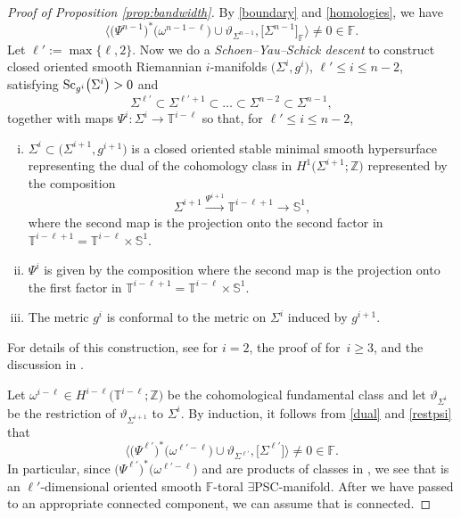 \documentclass[10pt,a4paper]{amsart}
\numberwithin{equation}{section}
\newcommand{\F}{\mathbb{F}}
\newcommand{\Z}{\mathbb{Z}}
\newcommand{\SSS}{\mathbb{S}}
\newcommand{\TTT}{\mathbb{T}}
\newcommand{\Sc}{{\rm Sc}}
\newcommand{\yes}{{\color {blue!70!black}$\exists$}{\sf PSC}}
\begin{document}
\begin{proof}[Proof of Proposition \ref{prop:bandwidth}]
By \eqref{boundary} and \eqref{homologies}, we have
\[
 \big\langle \big( \Psi^{n-1}\big)^* \big(\omega^{n-1-\ell}\big) \cup \vartheta_{\Sigma^{n-1}} , \big[\Sigma^{n-1}\big]_\F \big\rangle \neq 0 \in \F.
\]
Let $\ell' := \max\{ \ell, 2\}$.
Now we do a {\em Schoen--Yau--Schick descent} to construct closed oriented smooth Riemannian $i$-manifolds $\big(\Sigma^i, g^i\big)$, $\ell' \leq i \leq n-2$, satisfying $\Sc_{g^i} \big( \Sigma^i\big)> 0$ and
\[
 \Sigma^{\ell'} \subset \Sigma^{\ell'+1} \subset \dots \subset \Sigma^{n-2} \subset \Sigma^{n-1} ,
\]
together with maps $ \Psi^i \colon \Sigma^{i} \to {\TTT}^{i - \ell}$ so that, for $\ell' \leq i \leq n-2$,
\begin{enumerate}[(i)]\itemsep=0pt
 \item \label{dual} $\Sigma^{i} \subset \big(\Sigma^{i+1}, g^{i+1}\big)$ is a closed oriented stable minimal smooth hypersurface representing the dual of the cohomology class in $H^1\big(\Sigma^{i+1}; \Z\big)$ represented by the composition
 \[
 \Sigma^{i+1} \stackrel{\Psi^{i+1}}{\longrightarrow} {\TTT}^{i-\ell+1}\longrightarrow \SSS^1,
 \]
 where the second map is the projection onto the second factor in ${\TTT}^{i-\ell+1} = {\TTT}^{i-\ell} \times \SSS^1$.
 \item \label{restpsi} $\Psi^i$ is given by the composition
 \smash{$
 \Psi^{i} \colon\ \Sigma^{i} \stackrel{\Psi^{i+1}}{\longrightarrow} {\TTT}^{i-\ell+1} \longrightarrow {\TTT}^{i-\ell}
 $}
 where the second map is the projection onto the first factor in ${\TTT}^{i-\ell+1} = {\TTT}^{i-\ell} \times \SSS^1$.
 \item The metric $g^i$ is conformal to the metric on $\Sigma^i$ induced by $g^{i+1}$.
 \end{enumerate}
 For details of this construction, see \cite[Theorem 5.1]{S-Y1979} for $i =2$, the proof of \cite[Theorem 1]{SY} for~${i \geq 3}$, and the discussion in \cite{Sch98}.


 Let $\omega^{i-\ell} \in H^{i - \ell}\big( {\TTT}^{i-\ell}; \Z\big)$ be the cohomological fundamental class and let $\vartheta_{\Sigma^{i}}$ be the restriction of $\vartheta_{\Sigma^{i+1}}$ to $\Sigma^i$.
By induction, it follows from \ref{dual} and \ref{restpsi} that
\[
 \big\langle \big(\Psi^{\ell'}\big)^* \big(\omega^{\ell'-\ell}\big) \cup \vartheta_{\Sigma^{\ell'}} , \big[\Sigma^{\ell'}\big] \big\rangle \neq 0 \in \F.
 \]
 In particular, since $\big(\Psi^{\ell'}\big)^* \big(\omega^{\ell'-\ell}\big)$ and  are products of classes in \smash{$H^1\big( \Sigma^{\ell'} ; \F\big)$}, we see that  is an $\ell'$-dimensional oriented smooth $\F$-toral \yes-manifold.
After we have passed to an appropriate connected component, we can assume that  is connected.


\end{proof}
\end{document}
